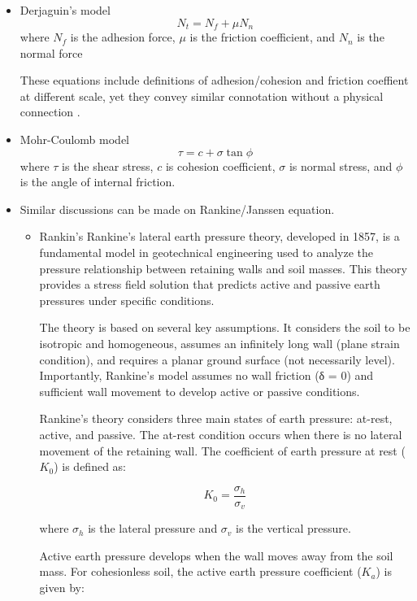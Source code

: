 \documentclass[xcolor=dvipsnames,10pt,hidelinks]{article}
\begin{document}
\begin{itemize}
\item Derjaguin's model
\label{sec:orgbdb26b0}
\begin{equation}
  \label{eq:Derjaguin}
 N_t =  N_f + \mu N_n
\end{equation}
where \(N_f\) is the adhesion force, \(\mu\) is the friction coefficient, and \(N_n\) is the normal force

These equations include definitions of adhesion/cohesion and friction coeffient at different scale, yet they convey similar connotation without a physical connection  \parencite{reynolds_lvii_1885}.
\item Mohr-Coulomb model
\label{sec:orgdaf758a}
\begin{equation}
  \label{eq:mc}
  \tau = c + \sigma\tan\phi
\end{equation}
where \(\tau\) is the shear stress, \(c\) is cohesion coefficient, \(\sigma\) is normal stress, and \(\phi\) is the angle of internal friction.
\item Similar discussions can be made on Rankine/Janssen equation.
\label{sec:org2847b96}

\begin{itemize}
\item Rankin's
Rankine's lateral earth pressure theory, developed in 1857, is a fundamental model in geotechnical engineering used to analyze the pressure relationship between retaining walls and soil masses. This theory provides a stress field solution that predicts active and passive earth pressures under specific conditions.

The theory is based on several key assumptions. It considers the soil to be isotropic and homogeneous, assumes an infinitely long wall (plane strain condition), and requires a planar ground surface (not necessarily level). Importantly, Rankine's model assumes no wall friction (δ = 0) and sufficient wall movement to develop active or passive conditions.

Rankine's theory considers three main states of earth pressure: at-rest, active, and passive. The at-rest condition occurs when there is no lateral movement of the retaining wall. The coefficient of earth pressure at rest (\(K_0\)) is defined as:

$$ K_0 = \frac{\sigma_h}{\sigma_v} $$

where \(\sigma_{h}\) is the lateral pressure and \(\sigma_v\) is the vertical pressure.

Active earth pressure develops when the wall moves away from the soil mass. For cohesionless soil, the active earth pressure coefficient (\(K_a\)) is given by:


\end{itemize}
\end{itemize}
\end{document}
